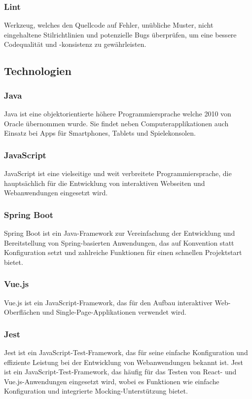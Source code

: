 \subsubsection{Lint}
Werkzeug, welches den Quellcode auf Fehler, unübliche Muster, nicht eingehaltene Stilrichtlinien und potenzielle Bugs
überprüfen, um eine bessere Codequalität und -konsistenz zu gewährleisten.


\subsection{Technologien}

\subsubsection{Java}
Java ist eine objektorientierte höhere Programmiersprache welche 2010 von Oracle übernommen wurde.
Sie findet neben Computerapplikationen auch Einsatz bei Apps für Smartphones, Tablets und Spielekonsolen.

\subsubsection{JavaScript}
JavaScript ist eine vielseitige und weit verbreitete Programmiersprache, die hauptsächlich für die Entwicklung von
interaktiven Webseiten und Webanwendungen eingesetzt wird.

\subsubsection{Spring Boot}
Spring Boot ist ein Java-Framework zur Vereinfachung der Entwicklung und Bereitstellung von Spring-basierten
Anwendungen, das auf Konvention statt Konfiguration setzt und zahlreiche Funktionen für einen schnellen Projektstart
bietet.

\subsubsection{Vue.js}
Vue.js ist ein JavaScript-Framework, das für den Aufbau interaktiver Web-Oberflächen und Single-Page-Applikationen verwendet wird.

\subsubsection{Jest}
Jest ist ein JavaScript-Test-Framework, das für seine einfache Konfiguration und effiziente Leistung bei der Entwicklung
von Webanwendungen bekannt ist. Jest ist ein JavaScript-Test-Framework, das häufig für das Testen von React- und
Vue.js-Anwendungen eingesetzt wird, wobei es Funktionen wie einfache Konfiguration und integrierte Mocking-Unterstützung
bietet.


